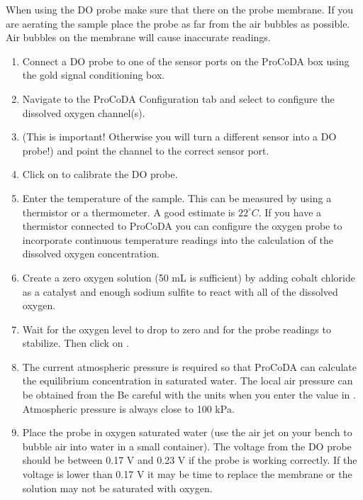 \documentclass[letterpaper,10pt,english]{sphinxmanual}
\begin{document}
When using the DO probe make sure that there  on the probe membrane. If you are aerating the sample place the probe as far from the air bubbles as possible. Air bubbles on the membrane will cause inaccurate readings.
\begin{enumerate}
\item {} 
Connect a DO probe to one of the sensor ports on the ProCoDA box using the gold signal conditioning box.

\item {} 
Navigate to the ProCoDA Configuration tab and select  to configure the dissolved oxygen channel(s).

\item {} 
 (This is important! Otherwise you will turn a different sensor into a DO probe!) and point the channel to the correct sensor port.

\item {} 
Click on  to calibrate the DO probe.

\item {} 
Enter the temperature of the sample. This can be measured by using a thermistor or a thermometer. A good estimate is \(22^\circ C\). If you have a thermistor connected to ProCoDA you can configure the oxygen probe to incorporate continuous temperature readings into the calculation of the dissolved oxygen concentration.

\item {} 
Create a zero oxygen solution (50 mL is sufficient) by adding cobalt chloride as a catalyst and enough sodium sulfite to react with all of the dissolved oxygen.

\item {} 
Wait for the oxygen level to drop to zero and for the probe readings to stabilize. Then click on .

\item {} 
The current atmospheric pressure is required so that ProCoDA can calculate the equilibrium concentration in saturated water. The local air pressure can be obtained from the  Be careful with the units when you enter the value in . Atmospheric pressure is always close to 100 kPa.

\item {} 
Place the probe in oxygen saturated water (use the air jet on your bench to bubble air into water in a small container).  The voltage from the DO probe should be between 0.17 V and 0.23 V if the probe is working correctly. If the voltage is lower than 0.17 V it may be time to replace the membrane or the solution may not be saturated with oxygen.


\end{enumerate}
\end{document}
